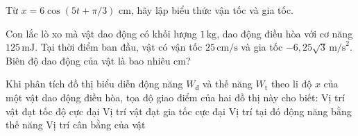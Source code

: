 \begin{ex}
Từ $x=6\cos(5t+\pi/3)$ cm, hãy lập biểu thức vận tốc và gia tốc.
\choiceTF

\end{ex}

\begin{ex}
Con lắc lò xo mà vật dao động có khối lượng $1\,\text{kg}$, dao động điều hòa với cơ năng $125\,\text{mJ}$. Tại thời điểm ban đầu, vật có vận tốc $25\,\text{cm/s}$ và gia tốc $-6,25\sqrt{3}\,\text{m/s}^2$. Biên độ dao động của vật là bao nhiêu cm?
\end{ex}

\begin{ex}
Khi phân tích đồ thị biểu diễn động năng $W_{\text{đ}}$ và thế năng $W_{\text{t}}$ theo li độ $x$ của một vật dao động điều hòa, tọa độ giao điểm của hai đồ thị này cho biết:
\choice
{Vị trí vật đạt tốc độ cực đại}
{Vị trí vật đạt gia tốc cực đại}
{\True Vị trí tại đó động năng bằng thế năng}
{Vị trí cân bằng của vật}
\end{ex}

